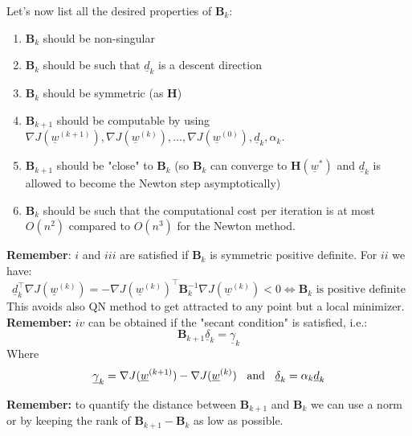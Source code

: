 Let's now list all the desired properties of $\mathbf{B}_k$:
\begin{enumerate}[i]
    \item $\textbf{B}_k$ should be non-singular
    \item $\textbf{B}_k$ should be such that $\underline{d}_k$ is a descent direction
    \item $\textbf{B}_k$ should be symmetric (as $\textbf{H}$)
    \item $\textbf{B}_{k+1}$ should be computable by using $\nabla J(\underline{w}^{(k+1)}), \nabla J(\underline{w}^{(k)}), \dots, \nabla J(\underline{w}^{(0)}), \underline{d}_k, \alpha_k$.
    \item $\textbf{B}_{k+1}$ should be "close" to $\textbf{B}_{k}$ (so $\textbf{B}_{k}$ can converge to $\textbf{H}(\underline{w}^*)$ and $\underline{d}_k$ is allowed to become the Newton step asymptotically)
    \item $\textbf{B}_{k}$ should be such that the computational cost per iteration is at most $O(n^2)$ compared to $O(n^3)$ for the Newton method. 
\end{enumerate}

\textbf{Remember}: $i$ and $iii$ are satisfied if $\textbf{B}_k$ is symmetric positive definite. For $ii$ we have:
\[
    \underline{d}_k^\intercal \nabla J(\underline{w}^{(k)}) = -\nabla J(\underline{w}^{(k)})^\intercal \mathbf{B}_k^{-1} \nabla J(\underline{w}^{(k)}) < 0 \iff \textbf{B}_k \text{ is positive definite}    
\]
This avoids also QN method to get attracted to any point but a local minimizer.\\

\textbf{Remember: } $iv$ can be obtained if the "secant condition" is satisfied, i.e.:
\[
    \mathbf{B}_{k+1} \underline{\delta}_k = \underline{\gamma}_k   
\]
Where
\[
    \underline{\gamma}_k = \nabla J(\underline{w}^{(k+1)}) - \nabla J(\underline{w}^{(k)}) \hspace{0.2cm} \text{ and } \hspace{0.2cm} \underline{\delta}_k = \alpha_k \underline{d}_k
\]

\textbf{Remember: } to quantify the distance between $\textbf{B}_{k+1}$ and $\textbf{B}_{k}$ we can use a norm or by keeping the rank of $\textbf{B}_{k+1} - \textbf{B}_{k}$ as low as possible.\\

